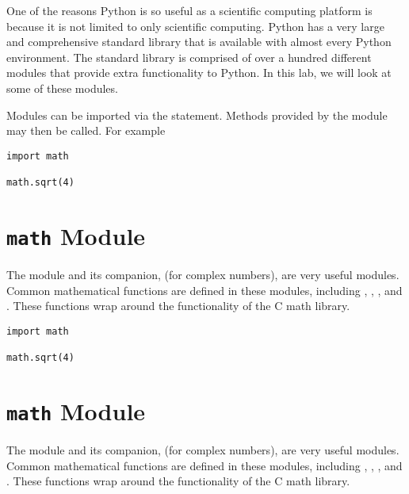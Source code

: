
One of the reasons Python is so useful as a scientific computing platform is because it is not limited to only scientific computing.
Python has a very large and comprehensive standard library that is available with almost every Python environment.
The standard library is comprised of over a hundred different modules that provide extra functionality to Python.
In this lab, we will look at some of these modules.

Modules can be imported via the  statement. Methods provided by the module may then be called.  For example

\begin{lstlisting}
import math

math.sqrt(4)
\end{lstlisting}

\section*{\texttt{math} Module}
The  module and its companion,  (for complex numbers), are very useful modules.
Common mathematical functions are defined in these modules, including , , , and .
These functions wrap around the functionality of the C math library.

\begin{lstlisting}
import math

math.sqrt(4)
\end{lstlisting}

\section*{\texttt{math} Module}
The  module and its companion,  (for complex numbers), are very useful modules.
Common mathematical functions are defined in these modules, including , , , and .  These functions wrap around the functionality of the C math library.

